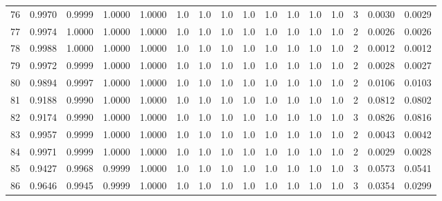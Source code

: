 \begin{tabular}{lrrrrrrrrrrrrrrr}
76  &      0.9970 &  0.9999 &  1.0000 &  1.0000 &     1.0 &     1.0 &     1.0 &     1.0 &     1.0 &     1.0 &      1.0 &        1.0 &      3 &                    0.0030 &                     0.0029 \\
77  &      0.9974 &  1.0000 &  1.0000 &  1.0000 &     1.0 &     1.0 &     1.0 &     1.0 &     1.0 &     1.0 &      1.0 &        1.0 &      2 &                    0.0026 &                     0.0026 \\
78  &      0.9988 &  1.0000 &  1.0000 &  1.0000 &     1.0 &     1.0 &     1.0 &     1.0 &     1.0 &     1.0 &      1.0 &        1.0 &      2 &                    0.0012 &                     0.0012 \\
79  &      0.9972 &  0.9999 &  1.0000 &  1.0000 &     1.0 &     1.0 &     1.0 &     1.0 &     1.0 &     1.0 &      1.0 &        1.0 &      2 &                    0.0028 &                     0.0027 \\
80  &      0.9894 &  0.9997 &  1.0000 &  1.0000 &     1.0 &     1.0 &     1.0 &     1.0 &     1.0 &     1.0 &      1.0 &        1.0 &      2 &                    0.0106 &                     0.0103 \\
81  &      0.9188 &  0.9990 &  1.0000 &  1.0000 &     1.0 &     1.0 &     1.0 &     1.0 &     1.0 &     1.0 &      1.0 &        1.0 &      2 &                    0.0812 &                     0.0802 \\
82  &      0.9174 &  0.9990 &  1.0000 &  1.0000 &     1.0 &     1.0 &     1.0 &     1.0 &     1.0 &     1.0 &      1.0 &        1.0 &      3 &                    0.0826 &                     0.0816 \\
83  &      0.9957 &  0.9999 &  1.0000 &  1.0000 &     1.0 &     1.0 &     1.0 &     1.0 &     1.0 &     1.0 &      1.0 &        1.0 &      2 &                    0.0043 &                     0.0042 \\
84  &      0.9971 &  0.9999 &  1.0000 &  1.0000 &     1.0 &     1.0 &     1.0 &     1.0 &     1.0 &     1.0 &      1.0 &        1.0 &      2 &                    0.0029 &                     0.0028 \\
85  &      0.9427 &  0.9968 &  0.9999 &  1.0000 &     1.0 &     1.0 &     1.0 &     1.0 &     1.0 &     1.0 &      1.0 &        1.0 &      3 &                    0.0573 &                     0.0541 \\
86  &      0.9646 &  0.9945 &  0.9999 &  1.0000 &     1.0 &     1.0 &     1.0 &     1.0 &     1.0 &     1.0 &      1.0 &        1.0 &      3 &                    0.0354 &                     0.0299 \\

\end{tabular}
